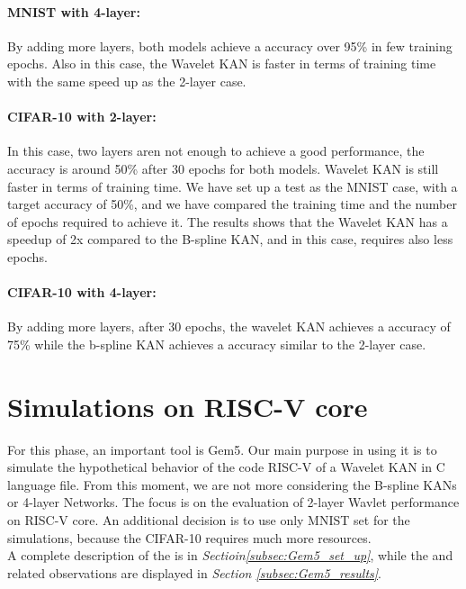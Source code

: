 \documentclass[11pt,a4paper,twocolumn]{article}
\begin{document}
\paragraph{MNIST with 4-layer:}
By adding more layers, both models achieve a accuracy over 95\% in few training epochs.
Also in this case, the Wavelet KAN is faster in terms of training time with the same speed up as the 2-layer case.
\paragraph{CIFAR-10 with 2-layer:}
In this case, two layers aren not enough to achieve a good performance, the accuracy is around 50\% after 30 epochs for
both models. Wavelet KAN is still faster in terms of training time. We have set up a test as the MNIST case,  with a target accuracy of 50\%,
and we have compared the training time and the number of epochs required to achieve it.
The results shows that the Wavelet KAN has a speedup of 2x compared to the B-spline KAN,
and in this case, requires also less epochs.
\paragraph{CIFAR-10 with 4-layer:} 
By adding more layers, after 30 epochs, the wavelet KAN achieves a accuracy of 75\% while the b-spline KAN achieves a accuracy
similar to the 2-layer case. 



\section{Simulations on RISC-V core}
\label{sec:simulations}
For this phase, an important tool is Gem5. Our main purpose in using it 
is to simulate the hypothetical behavior of the code RISC-V of a Wavelet 
KAN in C language file. From this moment, we are not more considering the B-spline 
KANs or 4-layer Networks. The focus is on the evaluation of 2-layer Wavlet performance on RISC-V core. 
An additional decision is to use only MNIST set for the simulations, because the CIFAR-10
requires much more resources.
\\
A complete description of the \textit{} is in \textit{Sectioin\ref{subsec:Gem5_set_up}}, 
while the \textit{} and related observations are displayed in \textit{Section \ref{subsec:Gem5_results}}.
\end{document}
